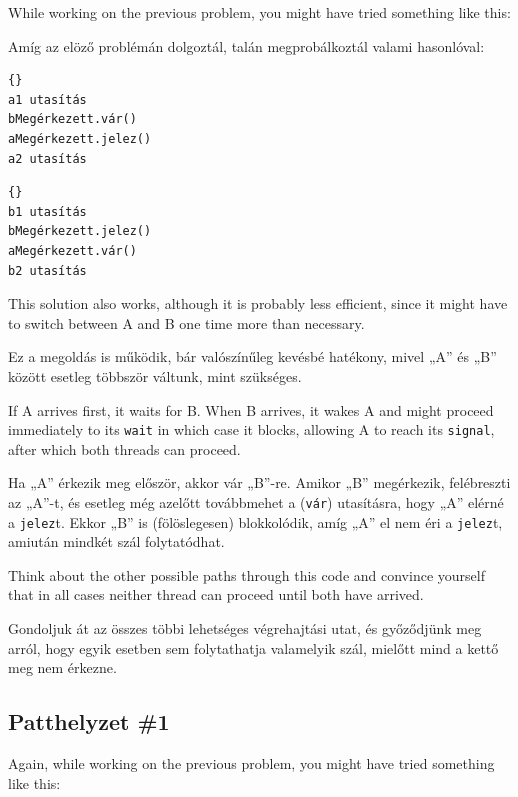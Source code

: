 \documentclass{book}
\begin{document}
While working on the previous problem, you might have
tried something like this:

Amíg az elöző problémán dolgoztál,
talán megprobálkoztál valami hasonlóval:


\begin{minipage}[t]{2in}
\begin{lstlisting}[title={„A” szál}]{}
a1 utasítás
bMegérkezett.vár()
aMegérkezett.jelez()
a2 utasítás
\end{lstlisting}
\end{minipage}
\hfill
\begin{minipage}[t]{2in}
\begin{lstlisting}[title={„B” szál}]{}
b1 utasítás
bMegérkezett.jelez()
aMegérkezett.vár()
b2 utasítás
\end{lstlisting}
\end{minipage}

This solution also works, although it is probably less
efficient, since it might have to switch between A and B
one time more than necessary.

Ez a megoldás is működik, bár valószínűleg kevésbé hatékony,
mivel „A” és „B” között esetleg többször váltunk, mint szükséges.

If A arrives first, it waits for B.  When B arrives, it wakes
A and might proceed immediately to its {\tt wait} in which
case it blocks, allowing A to reach its {\tt signal}, after
which both threads can proceed.

Ha „A” érkezik meg először, akkor vár „B”-re. Amikor „B” megérkezik,
felébreszti az „A”-t, és esetleg még azelőtt továbbmehet a ({\tt vár}) utasításra,
hogy „A” elérné a {\tt jelez}t. Ekkor „B” is (fölöslegesen)
blokkolódik, amíg „A” el nem éri a {\tt jelez}t, amiután mindkét szál folytatódhat.

Think about the other possible paths through this code and
convince yourself that in all cases neither thread can
proceed until both have arrived.

Gondoljuk át az összes többi lehetséges végrehajtási utat,
és győződjünk meg arról, hogy egyik esetben sem folytathatja
valamelyik szál, mielőtt mind a kettő meg nem érkezne.

\subsection {Patthelyzet \#1}

Again, while working on the previous problem, you might have
tried something like this:
\end{document}
